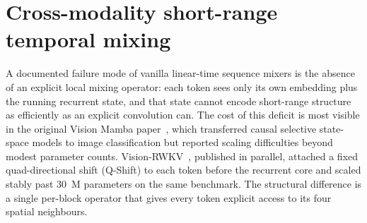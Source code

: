 \section{Cross-modality short-range temporal mixing}

A documented failure mode of vanilla linear-time sequence mixers
is the absence of an explicit local mixing operator: each token
sees only its own embedding plus the running recurrent state, and
that state cannot encode short-range structure as efficiently as
an explicit convolution can. The cost of this deficit is most
visible in the original Vision Mamba
paper~\cite{zhu2024visionmamba}, which transferred causal
selective state-space models to image classification but reported
scaling difficulties beyond modest parameter counts.
Vision-RWKV~\cite{duan2024visionrwkv}, published in parallel,
attached a fixed quad-directional shift (Q-Shift) to each token
before the recurrent core and scaled stably past 30~M parameters
on the same benchmark. The structural difference is a single
per-block operator that gives every token explicit access to its
four spatial neighbours.

